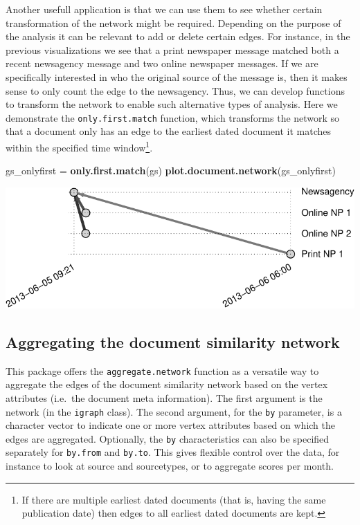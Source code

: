 \documentclass[]{article}
\newenvironment{Shaded}{\begin{snugshade}}{\end{snugshade}}
\newcommand{\KeywordTok}[1]{\textcolor[rgb]{0.13,0.29,0.53}{\textbf{{#1}}}}
\newcommand{\StringTok}[1]{\textcolor[rgb]{0.31,0.60,0.02}{{#1}}}
\newcommand{\NormalTok}[1]{{#1}}
\let\rmarkdownfootnote\footnote%
\def\footnote{\protect\rmarkdownfootnote}
\begin{document}
Another usefull application is that we can use them to see whether
certain transformation of the network might be required. Depending on
the purpose of the analysis it can be relevant to add or delete certain
edges. For instance, in the previous visualizations we see that a print
newspaper message matched both a recent newsagency message and two
online newspaper messages. If we are specifically interested in who the
original source of the message is, then it makes sense to only count the
edge to the newsagency. Thus, we can develop functions to transform the
network to enable such alternative types of analysis. Here we
demonstrate the \texttt{only.first.match} function, which transforms the
network so that a document only has an edge to the earliest dated
document it matches within the specified time window\footnote{If there
  are multiple earliest dated documents (that is, having the same
  publication date) then edges to all earliest dated documents are kept.}.

\begin{Shaded}
\begin{Highlighting}[]
\NormalTok{gs_onlyfirst =}\StringTok{ }\KeywordTok{only.first.match}\NormalTok{(gs)}
\KeywordTok{plot.document.network}\NormalTok{(gs_onlyfirst)}
\end{Highlighting}
\end{Shaded}

\includegraphics{vignette_files/figure-latex/unnamed-chunk-17-1.pdf}

\subsection{Aggregating the document similarity
network}\label{aggregating-the-document-similarity-network}

This package offers the \texttt{aggregate.network} function as a
versatile way to aggregate the edges of the document similarity network
based on the vertex attributes (i.e.~the document meta information). The
first argument is the network (in the \texttt{igraph} class). The second
argument, for the \texttt{by} parameter, is a character vector to
indicate one or more vertex attributes based on which the edges are
aggregated. Optionally, the \texttt{by} characteristics can also be
specified separately for \texttt{by.from} and \texttt{by.to}. This gives
flexible control over the data, for instance to look at source and
sourcetypes, or to aggregate scores per month.
\end{document}
